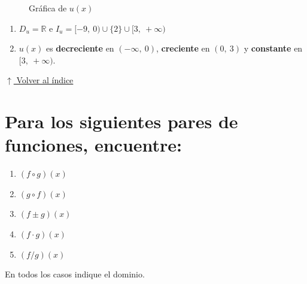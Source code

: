 \documentclass[12pt]{article}
\newcommand{\volverindice}{%
    \vspace{1em}%
    \begin{flushright}%
        \hyperlink{indice}{\small $\uparrow$ Volver al índice}%
    \end{flushright}%
}
\begin{document}
\begin{enumerate}[label=\alph*.-]
\begin{figure}[H]
        \caption{Gráfica de $u(x)$}
    \end{figure}
 
    \begin{enumerate}[label=\roman*.]
        \item $D_u = \mathbb{R}$ \quad e \quad $I_u = [-9,\ 0) \cup \{2\} \cup [3,\ +\infty)$
        \item $u(x)$ es \textbf{decreciente} en $(-\infty,\ 0)$, \textbf{creciente} en $(0,\ 3)$ y \textbf{constante} en $[3,\ +\infty)$.
    \end{enumerate}
\end{enumerate}
 
\volverindice
\newpage

\section[Operaciones con funciones]{Para los siguientes pares de funciones, encuentre:}
 
\begin{enumerate}[label=\roman*.]
    \item $(f \circ g)(x)$
    \item $(g \circ f)(x)$
    \item $(f \pm g)(x)$
    \item $(f \cdot g)(x)$
    \item $(f / g)(x)$
\end{enumerate}
 
En todos los casos indique el dominio.
 
\end{document}

